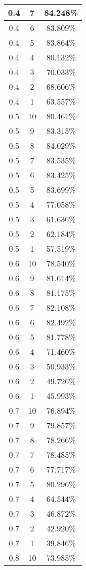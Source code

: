\begin{center}
\begin{longtable}{|c | c | c|}
\hline
0.4 & 7 & 84.248\% \\
\hline
0.4 & 6 & 83.809\% \\
\hline
0.4 & 5 & 83.864\% \\
\hline
0.4 & 4 & 80.132\% \\
\hline
0.4 & 3 & 70.033\% \\
\hline
0.4 & 2 & 68.606\% \\
\hline
0.4 & 1 & 63.557\% \\
\hline
\hline
0.5 & 10 & 80.461\% \\
\hline
0.5 & 9 & 83.315\% \\
\hline
0.5 & 8 & 84.029\% \\
\hline
0.5 & 7 & 83.535\% \\
\hline
0.5 & 6 & 83.425\% \\
\hline
0.5 & 5 & 83.699\% \\
\hline
0.5 & 4 & 77.058\% \\
\hline
0.5 & 3 & 61.636\% \\
\hline
0.5 & 2 & 62.184\% \\
\hline
0.5 & 1 & 57.519\% \\
\hline
\hline
0.6 & 10 & 78.540\% \\
\hline
0.6 & 9 & 81.614\% \\
\hline
0.6 & 8 & 81.175\% \\
\hline
0.6 & 7 & 82.108\% \\
\hline
0.6 & 6 & 82.492\% \\
\hline
0.6 & 5 & 81.778\% \\
\hline
0.6 & 4 & 71.460\% \\
\hline
0.6 & 3 & 50.933\% \\
\hline
0.6 & 2 & 49.726\% \\
\hline
0.6 & 1 & 45.993\% \\
\hline
\hline
0.7 & 10 & 76.894\% \\
\hline
0.7 & 9 & 79.857\% \\
\hline
0.7 & 8 & 78.266\% \\
\hline
0.7 & 7 & 78.485\% \\
\hline
0.7 & 6 & 77.717\% \\
\hline
0.7 & 5 & 80.296\% \\
\hline
0.7 & 4 & 64.544\% \\
\hline
0.7 & 3 & 46.872\% \\
\hline
0.7 & 2 & 42.920\% \\
\hline
0.7 & 1 & 39.846\% \\
\hline
\hline
0.8 & 10 & 73.985\% \\

\end{longtable}
\end{center}
